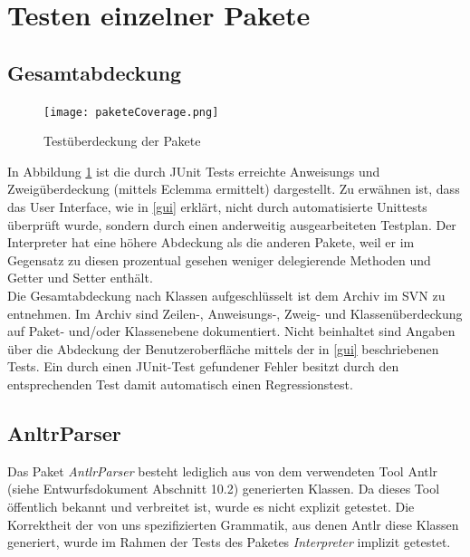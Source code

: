 \documentclass[parskip=full]{scrartcl}
\begin{document}
\newpage
\section{Testen einzelner Pakete}\label{einzelnePakete}

\subsection{Gesamtabdeckung}\label{abdeckung}
\begin{figure}[!h]
\centering
\texttt{[image: paketeCoverage.png]}
\caption{Testüberdeckung der Pakete}\label{AbdeckungPakete}
\end{figure}

In Abbildung \ref{AbdeckungPakete} ist die durch JUnit Tests erreichte Anweisungs und Zweigüberdeckung (mittels Eclemma ermittelt) dargestellt. Zu erwähnen ist, dass das User Interface, wie in \ref{gui} erklärt, nicht durch automatisierte Unittests überprüft wurde, sondern durch einen anderweitig ausgearbeiteten Testplan. Der Interpreter hat eine höhere Abdeckung als die anderen Pakete, weil er im Gegensatz zu diesen prozentual gesehen weniger delegierende Methoden und Getter und Setter enthält.\\
Die Gesamtabdeckung nach Klassen aufgeschlüsselt ist dem Archiv im SVN zu entnehmen.
Im Archiv sind Zeilen-, Anweisungs-, Zweig- und Klassenüberdeckung auf Paket- und/oder Klassenebene dokumentiert.
Nicht beinhaltet sind Angaben über die Abdeckung der Benutzeroberfläche mittels der in \ref{gui} beschriebenen Tests.
Ein durch einen JUnit-Test gefundener Fehler besitzt durch den entsprechenden Test damit automatisch einen Regressionstest.

\subsection{AnltrParser}\label{ANTLRPARSER}
Das Paket \textit{AntlrParser} besteht lediglich aus von dem verwendeten Tool Antlr (siehe Entwurfsdokument Abschnitt 10.2) generierten Klassen. Da dieses Tool öffentlich bekannt und verbreitet ist, wurde es nicht explizit getestet. Die Korrektheit der von uns spezifizierten Grammatik, aus denen Antlr diese Klassen generiert, wurde im Rahmen der Tests des Paketes \textit{Interpreter} implizit getestet.
\end{document}

